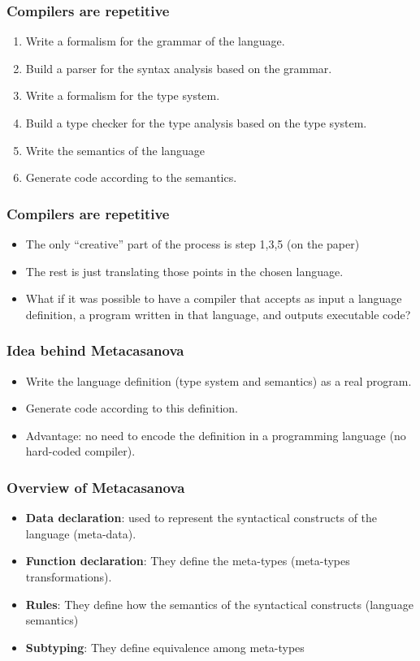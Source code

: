 \documentclass[10pt,a4paper]{beamer}
\begin{document}
\begin{frame}
	\frametitle{Compilers are repetitive}
	\begin{enumerate}
		\item Write a formalism for the grammar of the language.
		\item Build a parser for the syntax analysis based on the grammar.
		\item Write a formalism for the type system.
		\item Build a type checker for the type analysis based on the type system.
		\item Write the semantics of the language
		\item Generate code according to the semantics.
	\end{enumerate}
\end{frame}

\begin{frame}
	\frametitle{Compilers are repetitive}
	\begin{itemize}
		\item The only ``creative'' part of the process is step 1,3,5 (on the paper)
		\item The rest is just translating those points in the chosen language.
		\item What if it was possible to have a compiler that accepts as input a language definition, a program written in that language, and outputs executable code?
	\end{itemize}
\end{frame}

\begin{frame}
	\frametitle{Idea behind Metacasanova}
	\begin{itemize}
		\item Write the language definition (type system and semantics) as a real program.
		\item Generate code according to this definition.
		\item Advantage: no need to encode the definition in a programming language (no hard-coded compiler).
	\end{itemize}
\end{frame}

\begin{frame}
	\frametitle{Overview of Metacasanova}
	\begin{itemize}
		\item \textbf{Data declaration}: used to represent the syntactical constructs of the language (meta-data).
		\item \textbf{Function declaration}: They define the meta-types (meta-types transformations).
		\item \textbf{Rules}: They define how the semantics of the syntactical constructs (language semantics)
		\item \textbf{Subtyping}: They define equivalence among meta-types
	\end{itemize}
\end{frame}
\end{document}

